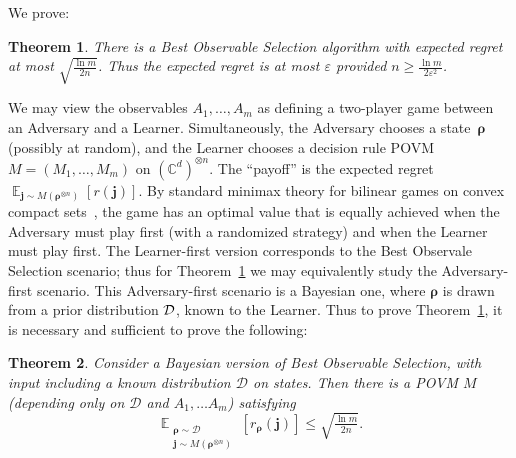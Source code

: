 \documentclass[10pt]{article}
\newcommand{\eps}{\epsilon}
\newcommand{\calD}{\mathcal{D}}
\renewcommand{\epsilon}{\varepsilon}
\let\mathbm\bm
\newcommand{\bj}{\mathbm{j}}
\newcommand{\brho}{\mathbm{\rho}}
\newcommand{\CC}{\mathbb{C}}
\DeclareMathOperator*{\EE}{\mathbb{E}}
\renewcommand{\bm}{\mathbf{m}}
\newtheorem{theorem}{Theorem}[section]
\begin{document}
\noindent We prove:

\begin{theorem} \label{thm:BOS}
    There is  a Best Observable Selection algorithm with expected regret at most $\sqrt{\frac{\ln m}{2n}}$. Thus the expected regret is at most $\epsilon$ provided $n \geq \frac{\ln m}{2\eps^2}$.
\end{theorem}

\noindent We may view the observables $A_1, \dots, A_m$ as defining a two-player game between an Adversary and a Learner. 
Simultaneously, the Adversary chooses a state~$\brho$ (possibly at random), and the Learner chooses a decision rule POVM $M = (M_1, \dots, M_m)$ on $(\CC^{d})^{\otimes n}$.  
The ``payoff'' is the expected regret $\EE_{\bj \sim M(\brho^{\otimes n})}[r(\bj)]$.  
By standard minimax theory for bilinear games on convex compact sets~\cite{Sio58}, the game has an optimal value that is equally achieved when the Adversary must play first (with a randomized strategy) and when the Learner must play first.
The Learner-first version corresponds to the Best Observale Selection scenario; thus for Theorem~\ref{thm:BOS} we may equivalently study the Adversary-first scenario.  
This Adversary-first scenario is a Bayesian one, where $\brho$ is drawn from a prior distribution $\cal{D}$, known to the Learner.  
Thus to prove Theorem~\ref{thm:BOS}, it is necessary and sufficient to prove the following:
\begin{theorem} \label{thm:BBOS}
    Consider a Bayesian version of Best Observable Selection, with input including a known distribution $\calD$ on states.
    Then there is a POVM $M$ (depending only on $\calD$ and $A_1, \dots A_m$) satisfying
    \begin{equation}
        \EE_{\substack{\brho \sim \calD \\ \bj \sim M(\brho^{\otimes n})}}[r_{\brho}(\bj)] \leq \sqrt{\tfrac{\ln m}{2n}}.
    \end{equation}
\end{theorem}
\end{document}
